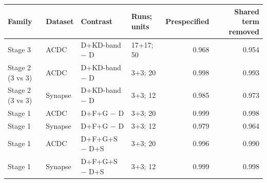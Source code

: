 \begin{tabular}{llllrr}
\toprule
Family & Dataset & Contrast & Runs; units & Prespecified & Shared term removed \\
\midrule
Stage 3 & ACDC & D+KD-band $-$ D & 17+17; 50 & 0.968 & 0.954 \\
Stage 2 (3 vs 3) & ACDC & D+KD-band $-$ D & 3+3; 20 & 0.998 & 0.993 \\
Stage 2 (3 vs 3) & Synapse & D+KD-band $-$ D & 3+3; 12 & 0.985 & 0.973 \\
Stage 1 & ACDC & D+F+G $-$ D & 3+3; 20 & 0.999 & 0.998 \\
Stage 1 & Synapse & D+F+G $-$ D & 3+3; 12 & 0.979 & 0.964 \\
Stage 1 & ACDC & D+F+G+S $-$ D+S & 3+3; 20 & 0.996 & 0.990 \\
Stage 1 & Synapse & D+F+G+S $-$ D+S & 3+3; 12 & 0.999 & 0.998 \\
\bottomrule
\end{tabular}
